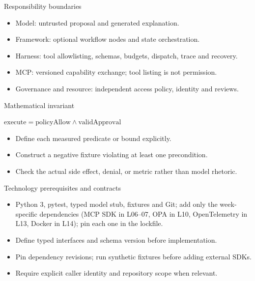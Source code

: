 \documentclass[aspectratio=169,10pt]{beamer}
\begin{document}
\begin{frame}{Responsibility boundaries}
\small
\begin{itemize}
\item Model: untrusted proposal and generated explanation.
\item Framework: optional workflow nodes and state orchestration.
\item Harness: tool allowlisting, schemas, budgets, dispatch, trace and recovery.
\item MCP: versioned capability exchange; tool listing is not permission.
\item Governance and resource: independent access policy, identity and reviews.
\end{itemize}

\end{frame}

\begin{frame}{Mathematical invariant}
\small
\begin{center}\Large $\mathrm{execute}=\mathrm{policyAllow}\land\mathrm{validApproval}$\end{center}
\begin{itemize}
\item Define each measured predicate or bound explicitly.
\item Construct a negative fixture violating at least one precondition.
\item Check the actual side effect, denial, or metric rather than model rhetoric.
\end{itemize}

\end{frame}

\begin{frame}{Technology prerequisites and contracts}
\small
\begin{itemize}
\item Python 3, pytest, typed model stub, fixtures and Git; add only the week-specific dependencies (MCP SDK in L06--07, OPA in L10, OpenTelemetry in L13, Docker in L14); pin each one in the lockfile.
\item Define typed interfaces and schema version before implementation.
\item Pin dependency revisions; run synthetic fixtures before adding external SDKs.
\item Require explicit caller identity and repository scope when relevant.
\end{itemize}

\end{frame}
\end{document}
